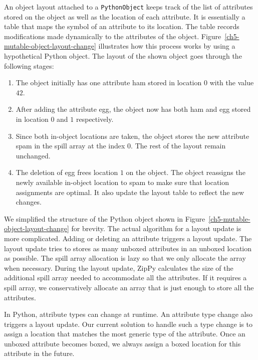 An object layout attached to a \texttt{PythonObject} keeps track of the list of attributes stored on the object as well as the location of each attribute.
It is essentially a table that maps the symbol of an attribute to its location.
The table records modifications made dynamically to the attributes of the object.
Figure~\ref{ch5-mutable-object-layout-change} illustrates how this process works by using a hypothetical Python object.
The layout of the shown object goes through the following stages:

\begin{enumerate}

\item The object initially has one attribute \textsf{ham} stored in location $0$ with the value $42$.

\item After adding the attribute \textsf{egg}, the object now has both \textsf{ham} and \textsf{egg} stored in location $0$ and $1$ respectively.

\item Since both in-object locations are taken, the object stores the new attribute \textsf{spam} in the spill array at the index $0$.
The rest of the layout remain unchanged.

\item The deletion of \textsf{egg} frees location $1$ on the object.
The object reassigns the newly available in-object location to \textsf{spam} to make sure that location assignments are optimal.
It also update the layout table to reflect the new changes.

\end{enumerate}

We simplified the structure of the Python object shown in Figure~\ref{ch5-mutable-object-layout-change} for brevity.
The actual algorithm for a layout update is more complicated.
Adding or deleting an attribute triggers a layout update.
The layout update tries to stores as many unboxed attributes in an unboxed location as possible.
The spill array allocation is lazy so that we only allocate the array when necessary.
During the layout update, ZipPy calculates the size of the additional spill array needed to accommodate all the attributes.
If it requires a spill array, we conservatively allocate an array that is just enough to store all the attributes.

In Python, attribute types can change at runtime.
An attribute type change also triggers a layout update.
Our current solution to handle such a type change is to assign a location that matches the most generic type of the attribute.
Once an unboxed attribute becomes boxed, we always assign a boxed location for this attribute in the future.

